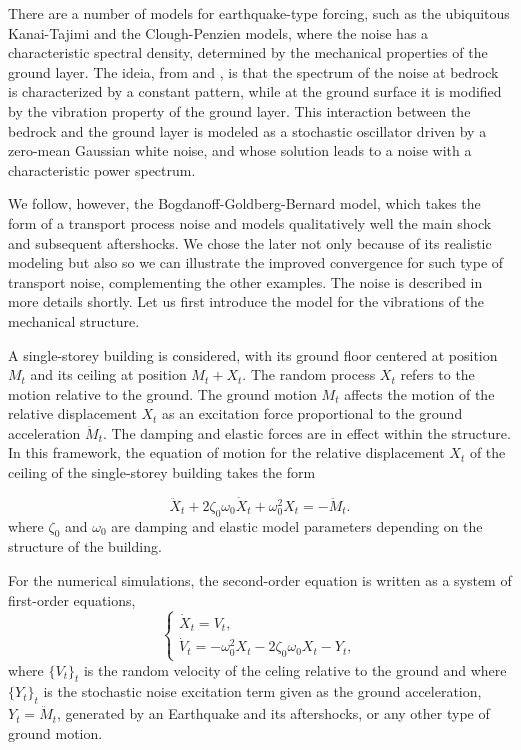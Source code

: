 \documentclass[reqno,12pt]{amsart}
\theoremstyle{plain} %
\theoremstyle{definition} %
\begin{document}
There are a number of models for earthquake-type forcing, such as the ubiquitous Kanai-Tajimi and the Clough-Penzien models, where the noise has a characteristic spectral density, determined by the mechanical properties of the ground layer. The ideia, from \cite{Kanai1957} and \cite{Tajimi1960}, is that the spectrum of the noise at bedrock is characterized by a constant pattern, while at the ground surface it is modified by the vibration property of the ground layer. This interaction between the bedrock and the ground layer is modeled as a stochastic oscillator driven by a zero-mean Gaussian white noise, and whose solution leads to a noise with a characteristic power spectrum.

We follow, however, the Bogdanoff-Goldberg-Bernard model, which takes the form of a transport process noise and models qualitatively well the main shock and subsequent aftershocks. We chose the later not only because of its realistic modeling but also so we can illustrate the improved convergence for such type of transport noise, complementing the other examples. The noise is described in more details shortly. Let us first introduce the model for the vibrations of the mechanical structure.

A single-storey building is considered, with its ground floor centered at position $M_t$ and its ceiling at position $M_t + X_t$. The random process $X_t$ refers to the motion relative to the ground. The ground motion $M_t$ affects the motion of the relative displacement $X_t$ as an excitation force proportional to the ground acceleration $\ddot M_t$. The damping and elastic forces are in effect within the structure. In this framework, the equation of motion for the relative displacement $X_t$ of the ceiling of the single-storey building takes the form

\begin{equation}
    \label{mechanicalstructuremodel}
    \ddot X_t + 2\zeta_0\omega_0\dot X_t + \omega_0^2 X_t = - \ddot M_t.
\end{equation}
where $\zeta_0$ and $\omega_0$ are damping and elastic model parameters depending on the structure of the building.

For the numerical simulations, the second-order equation is written as a system of first-order equations,
\[
    \begin{cases}
        \dot X_t = V_t, \\
        \dot V_t = - \omega_0^2 X_t - 2\zeta_0\omega_0 X_t - Y_t,
    \end{cases}
\]
where $\{V_t\}_t$ is the random velocity of the celing relative to the ground and where $\{Y_t\}_t$ is the stochastic noise excitation term given as the ground acceleration, $Y_t = \ddot M_t$, generated by an Earthquake and its aftershocks, or any other type of ground motion.
\end{document}
